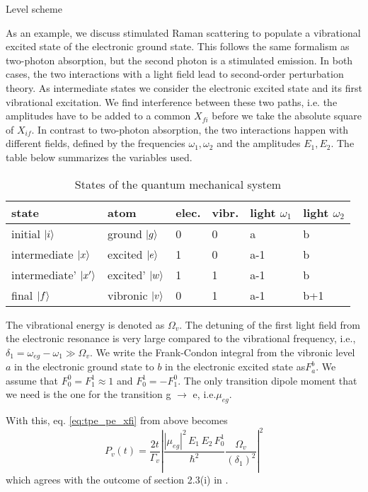 \begin{marginfigure}
\caption{ Level scheme }
\end{marginfigure}


As an example, we discuss stimulated Raman scattering to populate a vibrational excited state of the electronic ground state. This follows the same formalism as two-photon absorption, but the second photon is a stimulated emission. In both cases, the two interactions with a light field lead to second-order perturbation theory. As intermediate states we consider the electronic excited state and its first vibrational excitation. We find interference between these two paths, i.e. the amplitudes have to be added to a common $X_{fi}$ before we take the absolute square of $X_{if}$. In contrast to two-photon absorption, the two interactions happen with different fields, defined by the frequencies $\omega_1,\omega_2$ and the amplitudes $E_1,E_2$. The table below summarizes the variables used.

\begin{table}

\begin{tabular}{l|lll|ll}
state & atom & elec. & vibr. & light $\omega_1$ & light
$\omega_2$ \\ \hline%
initial $\ket{i}$ & ground  $\ket{g}$ & 0  & 0 & a  & b  \\%
intermediate $\ket{x}$ & excited  $\ket{e}$& 1 & 0  & a-1 & b \\%
intermediate' $\ket{x'}$ & excited'  $\ket{w}$& 1 & 1& a-1  & b \\ %
final $\ket{f}$ & vibronic  $\ket{v}$ & 0 &1& a-1 &b+1
\end{tabular}
\caption{States of the quantum mechanical system}
\end{table}

The vibrational energy is denoted as $ \Omega_v$. The detuning of the first light field from the electronic resonance is very large compared to the vibrational frequency, i.e.,  $\delta_1 = \omega_{eg} - \omega_1  \gg \Omega_v$. We write the Frank-Condon integral from the vibronic level $a$ in the electronic ground state to $b$ in the electronic excited state as$F_a^b$. We assume  that $F_0^0 = F_1^1 \approx 1$ and $F_0^1 = - F_1^0$. The only transition dipole moment that we need is the one for the transition g $\rightarrow$ e, i.e.$\mu_{eg}$.

With this, eq. \ref{eq:tpe_pe_xfi} from above becomes 
\begin{equation}
P_v(t)    =   \frac{2 t}{ \Gamma_v}
 \left|
 \frac{ |\mu_{eg}|^2 \, E_1 \, E_2  \, F_0^1}{\hbar^2}%
 \frac{\Omega_v}{(\delta_1)^2 } \right|^2
 \label{eq:tpe_vib_ex_final}
\end{equation}
which agrees with the outcome of section 2.3(i) in \cite{Winterhalder11}. 



